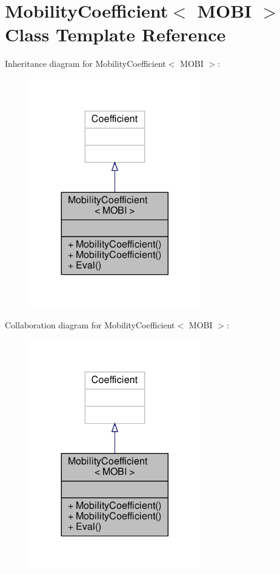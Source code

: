 \hypertarget{classMobilityCoefficient}{}\section{Mobility\+Coefficient$<$ M\+O\+BI $>$ Class Template Reference}
\label{classMobilityCoefficient}


Inheritance diagram for Mobility\+Coefficient$<$ M\+O\+BI $>$\+:\nopagebreak
\begin{figure}[H]
\begin{center}
\leavevmode
\includegraphics[width=212pt]{classMobilityCoefficient__inherit__graph}
\end{center}
\end{figure}


Collaboration diagram for Mobility\+Coefficient$<$ M\+O\+BI $>$\+:\nopagebreak
\begin{figure}[H]
\begin{center}
\leavevmode
\includegraphics[width=212pt]{classMobilityCoefficient__coll__graph}
\end{center}
\end{figure}
